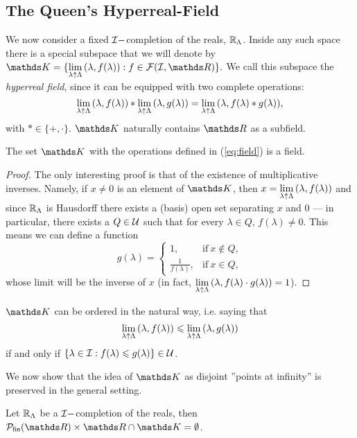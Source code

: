 \documentclass[draft.tex]{subfiles}
\begin{document}
\subsection{The Queen's Hyperreal-Field}
We now consider a fixed $\mathcal{I}-$completion of the reals, $\mathbb{R}_{\Lambda}$. Inside any such space there is a special subspace that we will denote by $\struct{K} = \{ \lambdalim{(\lambda, f(\lambda))}: f \in \cl{F}(\cl{I},\RR)\}.$ We call this subspace the \emph{hyperreal field}, since it can be equipped with two complete operations:
\begin{equation}
\label{eq:field}
    \lim\limits_{\lambda \uparrow \Lambda}{(\lambda, f(\lambda))} \ast \lim\limits_{\lambda \uparrow \Lambda}{(\lambda, g(\lambda))} = \lim\limits_{\lambda \uparrow \Lambda}{(\lambda, f(\lambda)\ast g(\lambda))},
\end{equation}
with $\ast \in \{+, \cdot\}$. $\struct{K}$ naturally contains $\RR$ as a subfield.
\begin{theorem}
The set $\struct{K}$ with the operations defined in (\ref{eq:field}) is a field.
\end{theorem}
\begin{proof}
The only interesting proof is that of the existence of multiplicative inverses. Namely, if $x \neq 0$ is an element of $\struct{K}$, then $x = \lim\limits_{\lambda \uparrow \Lambda}{(\lambda, f(\lambda))}$ and since $\mathbb{R}_{\Lambda}$ is Hausdorff there exists a (basis) open set separating $x$ and $0$ --- in particular, there exists a $Q \in \mathcal{U}$ such that for every $\lambda \in Q$, $f(\lambda) \neq 0$. This means we can define a function
\begin{equation*}
    g(\lambda) =
    \begin{cases}
    1, & \text{if} \ x \notin Q, \\
    \frac{1}{f(\lambda)}, & \text{if} \ x \in Q,
    \end{cases}
\end{equation*}
whose limit will be the inverse of $x$ (in fact, $\lim\limits_{\lambda \uparrow \Lambda}{(\lambda, f(\lambda)\cdot g(\lambda))} = 1$).
\end{proof}
$\struct{K}$ can be ordered in the natural way, i.e. saying that
\begin{equation*}
    \lim\limits_{\lambda \uparrow \Lambda}{(\lambda, f(\lambda))} \leqslant \lim\limits_{\lambda \uparrow \Lambda}{(\lambda, g(\lambda))}
\end{equation*}
if and only if $\{\lambda \in \mathcal{I}: f(\lambda) \leqslant g(\lambda)\} \in \mathcal{U}$.
\par We now show that the idea of $\struct{K}$ as disjoint ''points at infinity'' is preserved in the general setting.
\begin{lemma}
Let $\mathbb{R}_{\Lambda}$ be a $\mathcal{I}-$completion of the reals, then $\finset{\RR} \times \RR \cap \struct{K} = \emptyset$.
\end{lemma}
\end{document}
